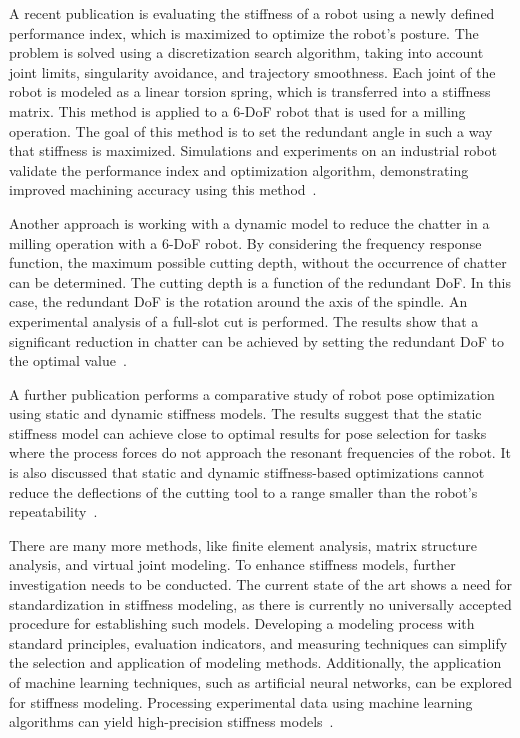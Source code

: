 A recent publication is evaluating the stiffness of a robot using a newly defined performance index, which is maximized to optimize the robot's posture. The problem is solved using a discretization search algorithm, taking into account joint limits, singularity avoidance, and trajectory smoothness. 
Each joint of the robot is modeled as a linear torsion spring, which is transferred into a stiffness matrix. This method is applied to a 6-\acrshort{DoF} robot that is used for a milling operation. The goal of this method is to set the redundant angle in such a way that stiffness is maximized. Simulations and experiments on an industrial robot validate the performance index and optimization algorithm, demonstrating improved machining accuracy using this method~\cite{Xiong.2019}.


Another approach is working with a dynamic model to reduce the chatter in a milling operation with a 6-\acrshort{DoF} robot. By considering the frequency response function, the maximum possible cutting depth, without the occurrence of chatter can be determined. The cutting depth is a function of the redundant \acrshort{DoF}. In this case, the redundant \acrshort{DoF} is the rotation around the axis of the spindle. An experimental analysis of a full-slot cut is performed. The results show that a significant reduction in chatter can be achieved by setting the redundant \acrshort{DoF} to the optimal value~\cite{Wang.2022}.

A further publication performs a comparative study of robot pose optimization using static and dynamic stiffness models. The results suggest that the static stiffness model can achieve close to optimal results for pose selection for tasks where the process forces do not approach the resonant frequencies of the robot. It is also discussed that static and dynamic stiffness-based optimizations cannot reduce the deflections of the cutting tool to a range smaller than the robot's repeatability~\cite{Cvitanic.2020}.

There are many more methods, like finite element analysis, matrix structure analysis, and virtual joint modeling. 
To enhance stiffness models, further investigation needs to be conducted. The current state of the art shows a need for standardization in stiffness modeling, as there is currently no universally accepted procedure for establishing such models. Developing a modeling process with standard principles, evaluation indicators, and measuring techniques can simplify the selection and application of modeling methods. Additionally, the application of machine learning techniques, such as artificial neural networks, can be explored for stiffness modeling. Processing experimental data using machine learning algorithms can yield high-precision stiffness models~\cite{Wu.2022}.
\newpage
